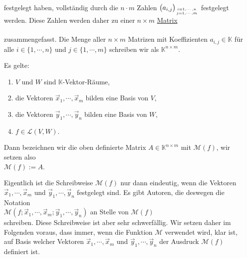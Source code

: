 festgelegt haben, vollst\"{a}ndig durch die $n \cdot m$ Zahlen $\bigl(a_{i,j}\bigr)_{i=1,\cdots,n \atop j=1,\cdots,m}$ festgelegt werden.  Diese Zahlen werden 
daher zu einer $n \times m$ \href{https://en.wikipedia.org/wiki/Matrix_(mathematics)}{Matrix}
\\[0.2cm]
\hspace*{1.3cm}
\colorbox{red}{}
\\[0.2cm]
zusammengefasst.  Die Menge aller $n \times m$ Matrizen mit Koeffizienten $a_{i,j} \in \mathbb{K}$
f\"{u}r alle $i \in \{1,\cdots,n\}$ und $j \in \{1,\cdots,m\}$ schreiben wir als $\mathbb{K}^{n \times
  m}$.

\begin{Definition}[$\mathcal{M}(f)$]
Es gelte:
\begin{enumerate}
\item $V$ und $W$ sind $\mathbb{K}$-Vektor-R\"{a}ume,
\item die Vektoren $\vec{x}_1, \cdots, \vec{x}_m$ bilden eine Basis von $V$,
\item die Vektoren $\vec{y}_1, \cdots, \vec{y}_n$ bilden eine Basis  von $W$,
\item $f \in \mathcal{L}(V, W)$.
\end{enumerate}
Dann bezeichnen wir die oben definierte Matrix $A \in \mathbb{K}^{n \times m}$ 
mit $\mathcal{M}(f)$, wir setzen also
\\[0.2cm]
\hspace*{1.3cm}
$\mathcal{M}(f) := A$. 
\eoxs
\end{Definition}

\remark
Eigentlich ist die Schreibweise $\mathcal{M}(f)$ nur dann eindeutig, wenn die Vektoren
$\vec{x}_1, \cdots, \vec{x}_m$ und $\vec{y}_1, \cdots, \vec{y}_n$ festgelegt sind.  Es
gibt Autoren, die deswegen die Notation
\\[0.2cm]
\hspace*{1.3cm}
$\mathcal{M}(f;\vec{x}_1, \cdots, \vec{x}_m; \vec{y}_1, \cdots, \vec{y}_n)$
\quad an Stelle von \quad $\mathcal{M}(f)$
\\[0.2cm]
schreiben.  Diese Schreibweise ist aber sehr schwerf\"{a}llig.  Wir
setzen daher im Folgenden voraus, dass immer, wenn die Funktion $\mathcal{M}$ verwendet wird, 
klar ist, auf Basis welcher Vektoren $\vec{x}_1, \cdots, \vec{x}_m$ und $\vec{y}_1, \cdots, \vec{y}_n$  
der Ausdruck $\mathcal{M}(f)$ definiert ist.


